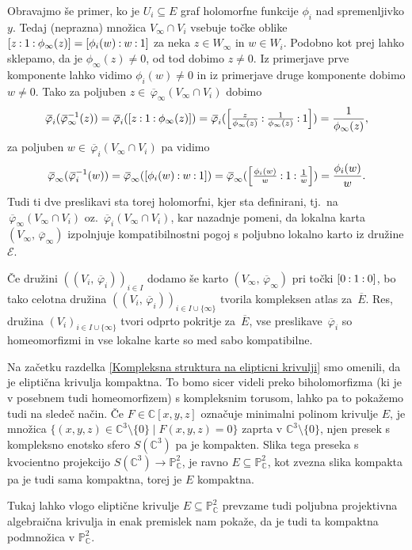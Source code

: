 \documentclass[mat1]{fmfdelo}
\numberwithin{equation}{section}
\newcommand{\C}{\mathbb C}
\newcommand{\PC}{\mathbb{P}^2_\C}
\newcommand{\inv}{^{-1}}
\newcommand{\pcoor}[1]{%
\begingroup\lccode`~=`: \lowercase{\endgroup
\edef~}{\mathbin{\mathchar\the\mathcode`:}\nobreak}%
\left[%
\begingroup
\mathcode`:=\string"8000
#1%
\endgroup
\right]%
}
\newcommand{\olsi}[1]{\,\overline{\!{#1}}} %
\newcommand{\tj}{tj.\ }
\theoremstyle{definition}
\begin{document}
Obravajmo še primer, ko je $U_i \subseteq E$ graf holomorfne funkcije $\phi_i$ nad spremenljivko $y$. Tedaj (neprazna) množica $V_\infty \cap V_i$ vsebuje točke oblike $\pcoor{z : 1 : \phi_\infty(z)} = \pcoor{\phi_i(w) : w : 1}$ za neka $z \in W_\infty$ in $w \in W_i$. Podobno kot prej lahko sklepamo, da je $\phi_\infty(z) \neq 0$, od tod dobimo $z \neq 0$. Iz primerjave prve komponente lahko vidimo $\phi_i(w) \neq 0$ in iz primerjave druge komponente dobimo $w \neq 0$. Tako za poljuben $z \in \olsi{\varphi}_\infty(V_\infty \cap V_i)$ dobimo
\[
    \olsi{\varphi}_i (\olsi{\varphi}_\infty\inv (z)) = 
    \olsi{\varphi}_i (\pcoor{z : 1 : \phi_\infty(z)}) = 
    \olsi{\varphi}_i (\pcoor{\tfrac{z}{\phi_\infty(z)} : \tfrac{1}{\phi_\infty(z)} : 1}) = 
    \frac{1}{\phi_\infty(z)},
\]
za poljuben $w \in \olsi{\varphi}_i(V_\infty \cap V_i)$ pa vidimo
\[
    \olsi{\varphi}_\infty (\olsi{\varphi}_i\inv(w)) =
    \olsi{\varphi}_\infty (\pcoor{\phi_i(w) : w : 1}) =
    \olsi{\varphi}_\infty (\pcoor{\tfrac{\phi_i(w)}{w} : 1 : \tfrac{1}{w}}) = 
    \frac{\phi_i(w)}{w}.
\]
Tudi ti dve preslikavi sta torej holomorfni, kjer sta definirani, \tj na $\olsi{\varphi}_\infty(V_\infty \cap V_i)$ oz. $\olsi{\varphi}_i(V_\infty \cap V_i)$, kar nazadnje pomeni, da lokalna karta $(V_\infty, \olsi{\varphi}_\infty)$ izpolnjuje kompatibilnostni pogoj s poljubno lokalno karto iz družine $\mathcal{E}$.

Če družini $((V_i, \olsi{\varphi}_i))_{i \in I}$ dodamo še karto $(V_\infty, \olsi{\varphi}_\infty)$ pri točki $\pcoor{0 : 1 : 0}$, bo tako celotna družina $((V_i,\olsi{\varphi}_i))_{i \in I \cup \{\infty\}}$ tvorila kompleksen atlas za $\olsi{E}$. Res, družina $(V_i)_{i \in I \cup \{\infty\}}$ tvori odprto pokritje za $\olsi{E}$, vse preslikave $\olsi{\varphi}_i$ so homeomorfizmi in vse lokalne karte so med sabo kompatibilne. 

\begin{opomba}
    Na začetku razdelka \ref{Kompleksna struktura na elipticni krivulji} smo omenili, da je eliptična krivulja kompaktna. To bomo sicer videli preko biholomorfizma (ki je v posebnem tudi homeomorfizem) s kompleksnim torusom, lahko pa to pokažemo tudi na sledeč način. Če $F \in \C[x,y,z]$ označuje minimalni polinom krivulje $E$, je množica $\{ (x,y,z) \in \C^3\setminus\{0\} \mid F(x,y,z) = 0\}$ zaprta v $\C^3\setminus\{0\}$, njen presek s kompleksno enotsko sfero $S(\C^3)$ pa je kompakten. Slika tega preseka s kvocientno projekcijo $S(\C^3) \to \PC$, je ravno $E\subseteq \PC$, kot zvezna slika kompakta pa je tudi sama kompaktna, torej je $E$ kompaktna. 
    
    Tukaj lahko vlogo eliptične krivulje $E \subseteq \PC$ prevzame tudi poljubna projektivna algebraična krivulja in enak premislek nam pokaže, da je tudi ta kompaktna podmnožica v $\PC$.
\end{opomba}
\end{document}
